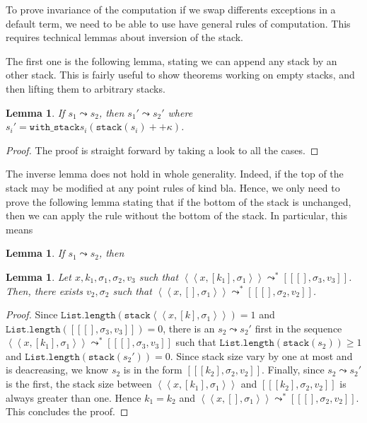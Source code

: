 \documentclass[english, references=cleveref]{programming}
\newtheorem{lemma}[theorem]{Lemma}
\newcommand{\leval}{\left\langle\!\!\left\langle}
\newcommand{\reval}{\right\rangle\!\!\right\rangle}
\newcommand{\lcont}{\left[\!\!\left[}
\newcommand{\rcont}{\right]\!\!\right]}
\begin{document}
To prove invariance of the computation if we swap differents exceptions in a default term, we need to be able to use have general rules of computation. This requires technical lemmas about inversion of the stack.

The first one is the following lemma, stating we can append any stack by an other stack. This is fairly useful to show theorems working on empty stacks, and then lifting them to arbitrary stacks.

\begin{lemma}
  If $s_1 \leadsto s_2$, then $s_1' \leadsto s_2'$ where $s_i' = \mathtt{with\_stack} s_i (\mathtt{stack}(s_i) ++ \kappa)$.
\end{lemma}
\begin{proof}
  The proof is straight forward by taking a look to all the cases.
\end{proof}

The inverse lemma does not hold in whole generality. Indeed, if the top of the stack may be modified at any point rules of kind bla. Hence, we only need to prove the following lemma stating that if the bottom of the stack is unchanged, then we can apply the rule without the bottom of the stack. In particular, this means

\begin{lemma}
  If $s_1 \leadsto s_2$, then

\end{lemma}



\begin{lemma}
  Let $x, k_1, \sigma_1, \sigma_2, v_3$ such that $\leval x, [k_1], \sigma_1 \reval \leadsto^* \lcont [], \sigma_3, v_3 \rcont$. Then, there exists $v_2, \sigma_2$ such that $\leval x, [], \sigma_1 \reval \leadsto^* \lcont [], \sigma_2, v_2 \rcont$.
\end{lemma}

\begin{proof}
  Since $\mathtt{List.length}(\mathtt{stack} \leval x, [k], \sigma_1 \reval) = 1$ and $\mathtt{List.length} (\lcont [], \sigma_3, v_3 \rcont) = 0$, there is an $s_2 \leadsto s_2'$ first in the sequence $\leval x, [k_1], \sigma_1 \reval \leadsto^* \lcont [], \sigma_3, v_3 \rcont$ such that $\mathtt{List.length}(\mathtt{stack}(s_2)) \geq 1$ and $\mathtt{List.length}(\mathtt{stack}(s_2')) = 0$. Since stack size vary by one at most and is deacreasing, we know $s_2$ is in the form $\lcont [k_2], \sigma_2, v_2 \rcont$. Finally, since $s_2 \leadsto s_2'$ is the first, the stack size between $\leval x, [k_1], \sigma_1 \reval$ and $\lcont [k_2], \sigma_2, v_2 \rcont$ is always greater than one. Hence $k_1 = k_2$ and $\leval x, [], \sigma_1 \reval \leadsto^* \lcont [], \sigma_2, v_2 \rcont$. This concludes the proof.
\end{proof}
\end{document}
